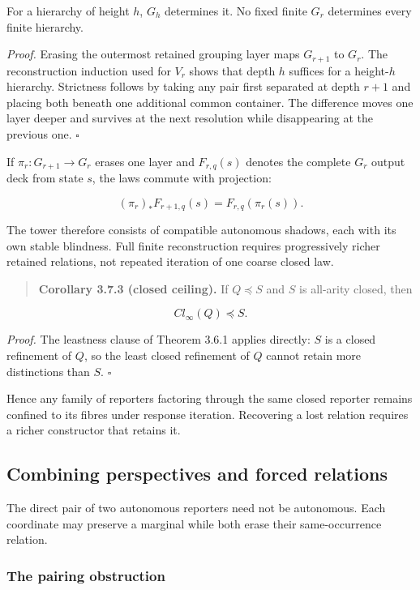 \documentclass[11pt,a4paper]{article}
\begin{document}
For a hierarchy of height \(h\), \(G_{h}\) determines it. No fixed
finite \(G_{r}\) determines every finite hierarchy.

\emph{Proof.} Erasing the outermost retained grouping layer maps
\(G_{r + 1}\) to \(G_{r}\). The reconstruction induction used for
\(V_{r}\) shows that depth \(h\) suffices for a height-\(h\) hierarchy.
Strictness follows by taking any pair first separated at depth \(r + 1\)
and placing both beneath one additional common container. The difference
moves one layer deeper and survives at the next resolution while
disappearing at the previous one. \(\ensuremath{\square}\)

If \(\pi_{r}:G_{r + 1} \rightarrow G_{r}\) erases one layer and
\(F_{r,q}(s)\) denotes the complete \(G_{r}\) output deck from state
\(s\), the laws commute with projection:

\[\boxed{\left( \pi_{r} \right)_{*}F_{r + 1,q}(s) = F_{r,q}\left( \pi_{r}(s) \right).}\]

The tower therefore consists of compatible autonomous shadows, each with
its own stable blindness. Full finite reconstruction requires
progressively richer retained relations, not repeated iteration of one
coarse closed law.

\begin{quote}
\textbf{Corollary 3.7.3 (closed ceiling).} If \(Q \preccurlyeq S\) and
\(S\) is all-arity closed, then
\end{quote}

\[{Cl}_{\infty}(Q) \preccurlyeq S.\]

\emph{Proof.} The leastness clause of Theorem 3.6.1 applies directly:
\(S\) is a closed refinement of \(Q\), so the least closed refinement of
\(Q\) cannot retain more distinctions than \(S\). \(\ensuremath{\square}\)

Hence any family of reporters factoring through the same closed reporter
remains confined to its fibres under response iteration. Recovering a
lost relation requires a richer constructor that retains it.

\subsection{Combining perspectives and forced
relations}

The direct pair of two autonomous reporters need not be autonomous. Each
coordinate may preserve a marginal while both erase their
same-occurrence relation.

\subsubsection{The pairing
obstruction}
\end{document}
